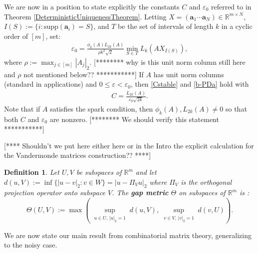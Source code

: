 \documentclass[journal, onecolumn]{IEEEtran}
\newtheorem{definition}{Definition}
\begin{document}
We are now in a position to state explicitly the constants $C$ and $\varepsilon_0$ referred to in Theorem \ref{DeterministicUniquenessTheorem}. Letting $X  = (\mathbf{a}_1 \cdots \mathbf{a}_N) \in \mathbb{R}^{m \times N}$, $I(S) := \{i : \text{supp}(\mathbf{a}_i) = S\}$, and $T$ be the set of intervals of length $k$ in a cyclic order of $[m]$, set:
\begin{align}\label{epsilon0}
\varepsilon_0 = \frac{ \phi_k(A) L_{2k}(A) }{\rho k^2 \sqrt{2}} \min_{S \in T} L_k(AX_{I(S)}),
\end{align}
where $\rho := \max_{j \in [m]} |A_j|_2 $. [******** why is this unit norm column still here and $\rho$ not mentioned below?? ***********]  If $A$ has unit norm columns (standard in applications) and $0 \leq \varepsilon < \varepsilon_0$, then \eqref{Cstable} and \eqref{b-PDa} hold with
\begin{align}\label{Cdef}
C = \frac{L_{2k}(A)}{ \varepsilon_0 \sqrt{2k}}.
\end{align}
Note that if $A$ satisfies the spark condition, then $\phi_k(A), L_{2k}(A) \neq 0$ so that both $C$ and $\varepsilon_0$ are nonzero.
[********  We should verify this statement ***********]


[**** Shouldn't we put here either here or in the Intro the explicit calculation for the Vandermonde matrices construction?? ****]

\begin{definition}\label{GapMetricDef}
Let $U, V$ be subspaces of $\mathbb{R}^m$ and let $d(u,V) := \inf\{|u-v|_2: v \in W\} = |u - \Pi_V u|_2$ where $\Pi_V$ is the orthogonal projection operator onto subspace $V$. The \textbf{gap metric} $\Theta$ on subspaces of $\mathbb{R}^{m}$ is \cite{akhiezer2013theory}:
\begin{equation}\label{SubspaceMetric}
\Theta(U,V) := \max\left( \sup_{\substack{u \in U, \, |u|_2 = 1}} d(u,V), \sup_{\substack{v \in V, \, |v|_2 = 1}} d(v,U) \right).
\end{equation}
\end{definition}

We are now state our main result from combinatorial matrix theory, generalizing \cite[Lemma 1]{Hillar15} to the noisy case.
\end{document}
